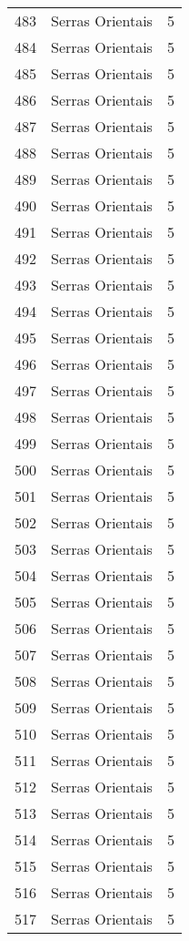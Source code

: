 \begin{table}[p]
\begin{tabular}{rlr}
  483 & Serras Orientais &   5 \\ 
  484 & Serras Orientais &   5 \\ 
  485 & Serras Orientais &   5 \\ 
  486 & Serras Orientais &   5 \\ 
  487 & Serras Orientais &   5 \\ 
  488 & Serras Orientais &   5 \\ 
  489 & Serras Orientais &   5 \\ 
  490 & Serras Orientais &   5 \\ 
  491 & Serras Orientais &   5 \\ 
  492 & Serras Orientais &   5 \\ 
  493 & Serras Orientais &   5 \\ 
  494 & Serras Orientais &   5 \\ 
  495 & Serras Orientais &   5 \\ 
  496 & Serras Orientais &   5 \\ 
  497 & Serras Orientais &   5 \\ 
  498 & Serras Orientais &   5 \\ 
  499 & Serras Orientais &   5 \\ 
  500 & Serras Orientais &   5 \\ 
  501 & Serras Orientais &   5 \\ 
  502 & Serras Orientais &   5 \\ 
  503 & Serras Orientais &   5 \\ 
  504 & Serras Orientais &   5 \\ 
  505 & Serras Orientais &   5 \\ 
  506 & Serras Orientais &   5 \\ 
  507 & Serras Orientais &   5 \\ 
  508 & Serras Orientais &   5 \\ 
  509 & Serras Orientais &   5 \\ 
  510 & Serras Orientais &   5 \\ 
  511 & Serras Orientais &   5 \\ 
  512 & Serras Orientais &   5 \\ 
  513 & Serras Orientais &   5 \\ 
  514 & Serras Orientais &   5 \\ 
  515 & Serras Orientais &   5 \\ 
  516 & Serras Orientais &   5 \\ 
  517 & Serras Orientais &   5 \\ 

\end{tabular}
\end{table}
